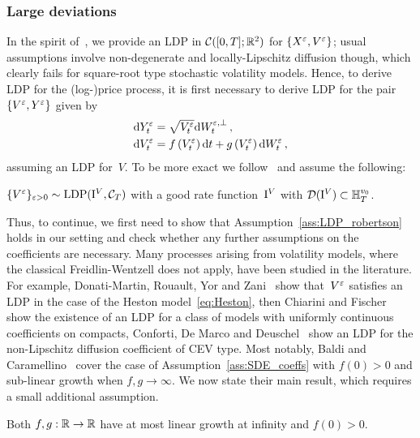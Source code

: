 \subsubsection{Large deviations}
In the spirit of~\cite{Freidlin2012RandomSystems}, 
we provide an LDP in ${\mathcal{C}([0,T];\mathbb{R}^2)}$ for $\{X^\varepsilon, V^\varepsilon\}$;
usual assumptions involve non-degenerate and locally-Lipschitz diffusion though, 
which clearly fails for square-root type stochastic volatility models. Hence, to derive LDP for the (log-)price process, it is first necessary to derive LDP for the pair $\{V^\varepsilon, Y^\varepsilon\}$ given by
\begin{align*}
\mathrm{d} Y^\varepsilon_{t} &= \sqrt{V^\varepsilon_{t}} \mathrm{d} W^{\varepsilon,\perp}_{t}\,, \\
\mathrm{d} V^\varepsilon_{t} &= f\left(V^\varepsilon_{t}\right) \mathrm{d} t + g\left(V^\varepsilon_{t}\right) \mathrm{d} W^\varepsilon_{t}\,,
\end{align*}
assuming an LDP for~$V$. 
To be more exact we follow~\cite{Robertson2010SampleModels} and assume the following:
\begin{assumption}\label{ass:LDP_robertson}
$\{V^{\varepsilon}\}_{\varepsilon>0}\sim\mathrm{LDP}(\mathrm{I}^{V}, \mathcal{C}_T)$
with a good rate function~$\mathrm{I}^{V}$ 
with ${\mathcal{D}(\mathrm{I}^{V})\subset\mathbb{H}_{T}^{v_0}}$.
\end{assumption}
Thus, to continue, we first need to show that Assumption~\ref{ass:LDP_robertson} holds in our setting and check whether any further assumptions on the coefficients are necessary. 
Many processes arising from volatility models, where the classical Freidlin-Wentzell does not apply, have been studied in the literature. 
For example, Donati-Martin, Rouault, Yor and Zani~\cite{Donati-Martin2004LargeProcesses} show that~$V^{\varepsilon}$ satisfies an LDP in the case of the Heston model~\eqref{eq:Heston}, then Chiarini and Fischer~\cite{Chiarini2014OnProcesses} show the existence of an LDP for a class of models with uniformly continuous coefficients on compacts, 
Conforti, De Marco and Deuschel~\cite{Conforti2015OnModels} 
show an LDP for the non-Lipschitz diffusion coefficient of CEV type. 
Most notably, Baldi and Caramellino~\cite{Baldi2011GeneralDiffusions} cover the case of Assumption~\ref{ass:SDE_coeffs} with $f(0)>0$ and sub-linear growth when $f,g\to\infty$. We now state their main result, which requires a small additional assumption.
\begin{assumption}\label{ass:Baldi}
Both $f,g:\mathbb{R}\to\mathbb{R}$ have at most linear growth at infinity and $f(0)>0$.
\end{assumption}
